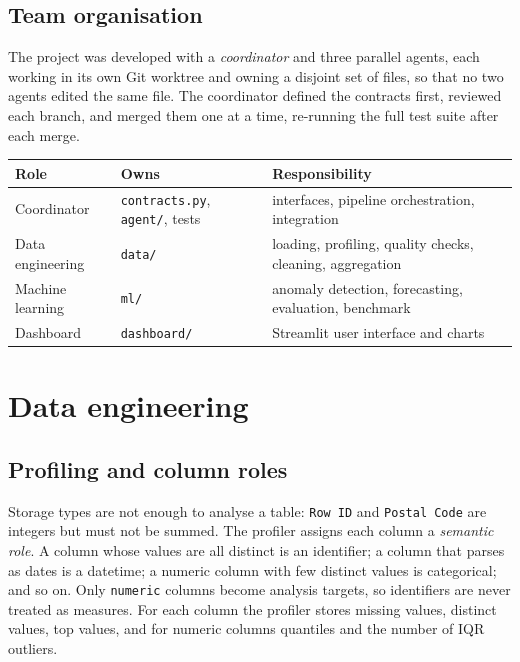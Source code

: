 \documentclass[11pt,a4paper]{article}
\newcommand{\code}[1]{\texttt{#1}}
\begin{document}
\subsection{Team organisation}
The project was developed with a \emph{coordinator} and three parallel agents, each working in its own Git
worktree and owning a disjoint set of files, so that no two agents edited the same file. The coordinator defined
the contracts first, reviewed each branch, and merged them one at a time, re-running the full test suite after
each merge.

\begin{center}
\small
\begin{tabularx}{\linewidth}{@{}llX@{}}
\toprule
Role & Owns & Responsibility \\
\midrule
Coordinator & \code{contracts.py}, \code{agent/}, tests & interfaces, pipeline orchestration, integration \\
Data engineering & \code{data/} & loading, profiling, quality checks, cleaning, aggregation \\
Machine learning & \code{ml/} & anomaly detection, forecasting, evaluation, benchmark \\
Dashboard & \code{dashboard/} & Streamlit user interface and charts \\
\bottomrule
\end{tabularx}
\end{center}

\section{Data engineering}

\subsection{Profiling and column roles}
Storage types are not enough to analyse a table: \code{Row ID} and \code{Postal Code} are integers but must
not be summed. The profiler assigns each column a \emph{semantic role}. A column whose values are all
distinct is an identifier; a column that parses as dates is a datetime; a numeric column with few distinct values
is categorical; and so on. Only \code{numeric} columns become analysis targets, so identifiers are never treated as
measures. For each column the profiler stores missing values, distinct values, top values, and for numeric columns
quantiles and the number of IQR outliers.
\end{document}
